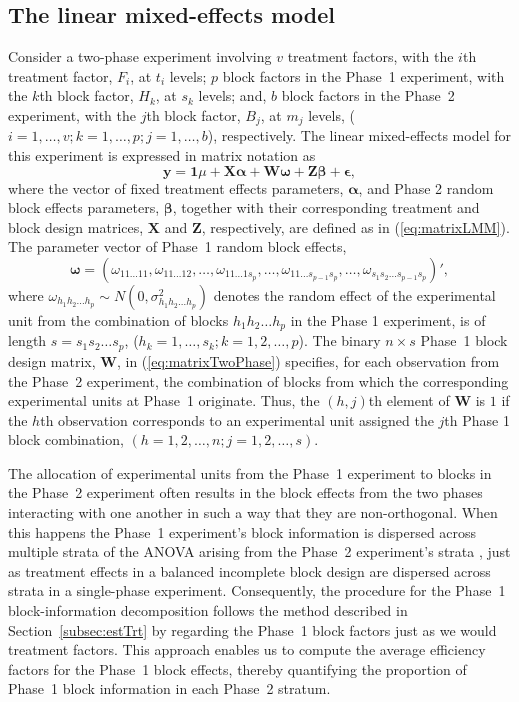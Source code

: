 \documentclass[article]{jss}
\newcommand{\Z}{\mathbf{Z}}
\newcommand{\X}{\mathbf{X}}
\newcommand{\W}{\mathbf{W}}
\begin{document}
\subsection{The linear mixed-effects model}
\label{subsec:phase2Model}
Consider a two-phase experiment involving $v$ treatment factors, with the $i$th treatment factor, $F_i$, at $t_i$ levels; $p$ block factors in the Phase~1 experiment, with the $k$th block factor, $H_k$, at $s_k$ levels; and, $b$ block factors in the Phase~2 experiment, with the $j$th block factor, $B_j$, at $m_j$ levels, ($i = 1,\dots,v; k = 1,\dots,p; j = 1,\dots,b$), respectively. The linear mixed-effects model for this experiment is expressed in matrix notation as 
\begin{equation}
\label{eq:matrixTwoPhase}
\bm{y} = \bm{1}\mu + \X\bm{\alpha} + \W\bm{\omega} + \Z\bm{\beta} + \bm{\epsilon},
\end{equation}
where the vector of fixed treatment effects parameters, $\bm{\alpha}$, and Phase 2 random block effects parameters, $\bm{\beta}$, together with their corresponding treatment and block design matrices, $\X$ and $\Z$, respectively, are defined as in (\ref{eq:matrixLMM}). The parameter vector of Phase~1 random block effects,  
\begin{equation}
\label{eq:phase1BlockPar}
\bm{\omega} = (\omega_{11 \dots 11}, \omega_{11 \dots 12}, \dots,  \omega_{1 1 \dots 1s_p},\dots,\omega_{1 1 \dots s_{p-1}s_p},\dots,\omega_{s_1 s_2 \dots s_{p-1}s_p})',
\end{equation}
where $\omega_{h_1 h_2 \dots h_p}\sim N(0,\sigma^2_{h_1 h_2 \dots h_p})$ denotes the random effect of the experimental unit from the combination of blocks $h_1h_2\ldots h_p$ in the Phase 1 experiment, is of length $s = s_1 s_2 \dots s_p$, ($h_k = 1, \dots, s_k; k = 1,2, \dots, p$). The binary $n \times s$ Phase~1 block design matrix, $\W$, in (\ref{eq:matrixTwoPhase}) specifies, for each observation from the Phase~2 experiment, the combination of blocks from which the corresponding experimental units at Phase~1 originate. Thus, the $(h,j)$th element of $\W$ is $1$ if the $h$th observation corresponds to an experimental unit assigned the $j$th Phase 1 block combination, $(h=1,2,\dots,n; j=1,2,\dots, s)$. 

The allocation of experimental units from the Phase~1 experiment to blocks in the Phase~2 experiment often results in the block effects from the two phases interacting with one another in such a way that they are non-orthogonal. When this happens the Phase~1 experiment's block information is dispersed across multiple strata of the ANOVA arising from the Phase~2 experiment's strata \citep{Wood1988}, just as treatment effects in a balanced incomplete block design are dispersed across strata in a single-phase experiment. Consequently, the procedure for the Phase~1 block-information decomposition follows the method described in Section~\ref{subsec:estTrt} by regarding the Phase~1 block factors just as we would treatment factors. This approach enables us to compute the average efficiency factors for the Phase~1 block effects, thereby quantifying the proportion of Phase~1 block information in each Phase~2 stratum.
\end{document}
